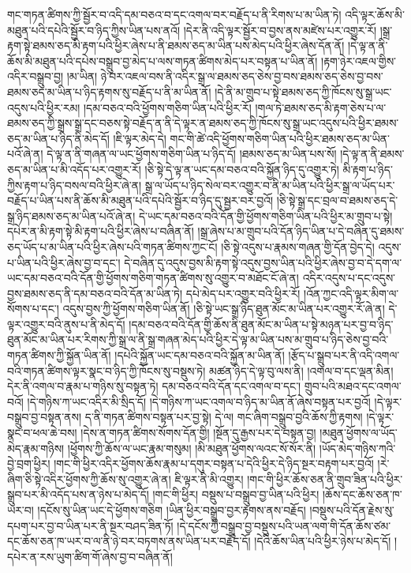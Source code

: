 གང་གཏན་ཚིགས་ཀྱི་སྦྱོར་བ་འདི་དམ་བཅའ་བ་དང་འགལ་བར་བརྗོད་པ་ནི་རིགས་པ་མ་ཡིན་ཏེ། འདི་ལྟར་ཆོས་མི་མཐུན་པའི་དཔེའི་སྦྱོར་བ་ཉིད་ཀྱིས་ཡིན་པས་ནའོ། །དེར་ནི་འདི་ལྟར་སྦྱོར་བ་བྱས་ནས་མཛེས་པར་འགྱུར་རོ། །སྒྲ་རྟག་སྟེ་ཐམས་ཅད་མི་རྟག་པའི་ཕྱིར་ཞེས་པ་ནི་ཐམས་ཅད་མ་ཡིན་པས་མེད་པའི་ཕྱིར་ཞེས་དོན་ནོ། །དེ་ལྟ་ན་ནི་ཆོས་མི་མཐུན་པའི་དཔེས་བསྒྲུབ་བྱ་མེད་པ་ལས་གཏན་ཚིགས་མེད་པར་བསྟན་པ་ཡིན་ནོ། །རྟག་ཉེར་འཇལ་གྱིས་འདིར་བསྒྲུབ་བྱ། །མ་ཡིན། ཉེ་བར་འཇལ་བས་ནི་འདིར་སྒྲ་ལ་ཐམས་ཅད་ཅེས་བྱ་བས་ཐམས་ཅད་ཅེས་བྱ་བས་ཐམས་ཅད་མ་ཡིན་པ་ཉིད་རྟགས་སུ་བརྗོད་པ་ནི་མ་ཡིན་ནོ། །དེ་ནི་མ་གྲུབ་པ་སྟེ་ཐམས་ཅད་ཀྱི་ཁོངས་སུ་སྒྲ་ཡང་འདུས་པའི་ཕྱིར་རམ། །དམ་བཅའ་བའི་ཕྱོགས་གཅིག་ཡིན་པའི་ཕྱིར་རོ། །གལ་ཏེ་ཐམས་ཅད་མི་རྟག་ཅེས་པ་ལ་ཐམས་ཅད་ཀྱི་སྒྲས་སྒྲ་དང་བཅས་སྟེ་བརྗོད་ན་ནི་དེ་ལྟར་ན་ཐམས་ཅད་ཀྱི་ཁོངས་སུ་སྒྲ་ཡང་འདུས་པའི་ཕྱིར་ཐམས་ཅད་མ་ཡིན་པ་ཉིད་ནི་མེད་དོ། །ཇི་ལྟར་མེད་དེ། གང་གི་ཚེ་འདི་ཕྱོགས་གཅིག་ཡིན་པའི་ཕྱིར་ཐམས་ཅད་མ་ཡིན་པའོ་ཞེ་ན། དེ་ལྟ་ན་ནི་གཞན་ལ་ཡང་ཕྱོགས་གཅིག་ཡིན་པ་ཉིད་དོ། །ཐམས་ཅད་མ་ཡིན་པས་སོ། །དེ་ལྟ་ན་ནི་ཐམས་ཅད་མ་ཡིན་པ་མི་འདོད་པར་འགྱུར་རོ། །ཅི་སྟེ་དེ་ལྟ་ན་ཡང་དམ་བཅའ་བའི་སྐྱོན་ཉིད་དུ་འགྱུར་ཏེ། མི་རྟག་པ་ཉིད་ཀྱིས་རྟག་པ་ཉིད་བསལ་བའི་ཕྱིར་ཞེ་ན། སྒྲ་ལ་ཡོད་པ་ཉིད་སེལ་བར་འགྱུར་བ་ནི་མ་ཡིན་པའི་ཕྱིར་སྒྲ་ལ་ཡོད་པར་བརྗོད་པ་ཡིན་པས་ནི་ཆོས་མི་མཐུན་པའི་དཔེའི་སྦྱོར་བ་ཉིད་དུ་སྦྱར་བར་བྱའོ། །ཅི་སྟེ་སྒྲ་དང་བྲལ་བ་ཐམས་ཅད་དེ་སྒྲ་ཉིད་ཐམས་ཅད་མ་ཡིན་པའོ་ཞེ་ན། དེ་ཡང་དམ་བཅའ་བའི་དོན་གྱི་ཕྱོགས་གཅིག་ཡིན་པའི་ཕྱིར་མ་གྲུབ་པ་སྟེ། དཔེར་ན་མི་རྟག་སྟེ་མི་རྟག་པའི་ཕྱིར་ཞེས་པ་བཞིན་ནོ། །སྒྲ་ཞེས་པ་མ་གྲུབ་པའི་དོན་ཉིད་ཡིན་པ་དེ་བཞིན་དུ་ཐམས་ཅད་ཡོད་པ་མ་ཡིན་པའི་ཕྱིར་ཞེས་པའི་གཏན་ཚིགས་ཀྱང་ངོ། །ཅི་སྟེ་འདུས་པ་རྣམས་གཞན་གྱི་དོན་བྱེད་དེ། འདུས་པ་ཡིན་པའི་ཕྱིར་ཞེས་བྱ་བ་དང་། དེ་བཞིན་དུ་འདུས་བྱས་མི་རྟག་སྟེ་འདུས་བྱས་ཡིན་པའི་ཕྱིར་ཞེས་བྱ་བ་དེ་དག་ལ་ཡང་དམ་བཅའ་བའི་དོན་གྱི་ཕྱོགས་གཅིག་གཏན་ཚིགས་སུ་འགྱུར་བ་མཐོང་ངོ་ཞེ་ན། འདིར་འདུས་པ་དང་འདུས་བྱས་ཐམས་ཅད་ནི་དམ་བཅའ་བའི་དོན་མ་ཡིན་ཏེ། དཔེ་མེད་པར་འགྱུར་བའི་ཕྱིར་རོ། །འོན་ཀྱང་འདི་ལྟར་མིག་ལ་སོགས་པ་དང་། འདུས་བྱས་ཀྱི་ཕྱོགས་གཅིག་ཡིན་ནོ། །ཅི་སྟེ་ཡང་སྒྲ་ཉིད་ཐུན་མོང་མ་ཡིན་པར་འགྱུར་རོ་ཞེ་ན། དེ་ལྟར་འགྱུར་བའི་ནུས་པ་ནི་མེད་དོ། །དམ་བཅའ་བའི་དོན་གྱི་ཆོས་ནི་ཐུན་མོང་མ་ཡིན་པ་སྟེ་མཉན་པར་བྱ་བ་ཉིད་ཐུན་མོང་མ་ཡིན་པར་རིགས་ཀྱི་སྒྲ་ལ་ནི་སྒྲ་གཞན་མེད་པའི་ཕྱིར་དེ་ལྟ་མ་ཡིན་པས་མ་གྲུབ་པ་ཉིད་ཅེས་བྱ་བའི་གཏན་ཚིགས་ཀྱི་སྐྱོན་ཡིན་ནོ། །དཔེའི་སྐྱོན་ཡང་དམ་བཅའ་བའི་སྐྱོན་མ་ཡིན་ནོ། །རྩོད་པ་སྒྲུབ་པར་ནི་འདི་འགལ་བའི་གཏན་ཚིགས་ལྟར་སྣང་བ་ཉིད་ཀྱི་ཁོངས་སུ་བསྡུས་ཏེ། མཚན་ཉིད་དེ་ལྟ་བུ་ལས་ནི། །འགལ་བ་དང་ལྡན་མིན། དེར་ནི་འགལ་བ་རྣམ་པ་གཉིས་སུ་བསྟན་ཏེ། དམ་བཅའ་བའི་དོན་དང་འགལ་བ་དང་། གྲུབ་པའི་མཐའ་དང་འགལ་བའོ། །དེ་གཉིས་ཀ་ཡང་འདིར་མི་སྲིད་དོ། །དེ་གཉིས་ཀ་ཡང་འགལ་བ་ཉིད་མ་ཡིན་ནོ་ཞེས་བསྟན་པར་བྱའོ། །དེ་ལྟར་བསྒྲུབ་བྱ་བསྟན་ནས། ད་ནི་གཏན་ཚིགས་བསྟན་པར་བྱ་སྟེ། དེ་ལ། གང་ཞིག་བསྒྲུབ་བྱའི་ཆོས་ཀྱི་རྟགས། །དེ་ལྟར་སྣང་བ་ཕལ་ཆེ་བས། །དེས་ན་གཏན་ཚིགས་སོགས་དོན་གྱི། །སྔོན་དུ་རྒྱས་པར་དེ་བསྟན་བྱ། །མཐུན་ཕྱོགས་ལ་ཡོད་མེད་རྣམ་གཉིས། །ཕྱོགས་ཀྱི་ཆོས་ལ་ཡང་རྣམ་གསུམ། །མི་མཐུན་ཕྱོགས་ལའང་སོ་སོར་ནི། །ཡོད་མེད་གཉིས་ཀའི་བྱེ་བྲག་ཕྱིར། །གང་གི་ཕྱིར་འདིར་ཕྱོགས་ཆོས་རྣམ་པ་དགུར་བསྟན་པ་དེའི་ཕྱིར་དེ་ཉིད་སྔར་བརྟག་པར་བྱའོ། །རེ་ཞིག་ཅི་སྟེ་འདིར་ཕྱོགས་ཀྱི་ཆོས་སུ་འགྱུར་ཞེ་ན། ཇི་ལྟར་ནི་མི་འགྱུར། །གང་གི་ཕྱིར་ཆོས་ཅན་ནི་གྲུབ་ཟིན་པའི་ཕྱིར་སྒྲུབ་པར་མི་འདོད་པས་ན་ཉེས་པ་མེད་དོ། །གང་གི་ཕྱིར། བསྡུས་པ་བསྒྲུབ་བྱ་ཡིན་པའི་ཕྱིར། །ཆོས་དང་ཆོས་ཅན་ཁ་ཡར་བ། །དངོས་སུ་ཡིན་ཡང་དེ་ཕྱོགས་གཅིག །ཡིན་ཕྱིར་བསྒྲུབ་བྱར་རྟགས་ནས་བརྗོད། །བསྡུས་པའི་དོན་རྗེས་སུ་དཔག་པར་བྱ་བ་ཡིན་པར་ནི་སྔར་བཤད་ཟིན་ཏོ། །དེ་དངོས་ཀྱི་བསྒྲུབ་བྱ་བསྡུས་པའི་ཡན་ལག་གི་དོན་ཆོས་ཙམ་དང་ཆོས་ཅན་ཁ་ཡར་བ་ལ་ནི་ཉེ་བར་བཏགས་ནས་ཡིན་པར་བརྗོད་དོ། །དེའི་ཆོས་ཡིན་པའི་ཕྱིར་ཉེས་པ་མེད་དོ། །དཔེར་ན་རས་ཡུག་ཚིག་གོ་ཞེས་བྱ་བ་བཞིན་ནོ། 
